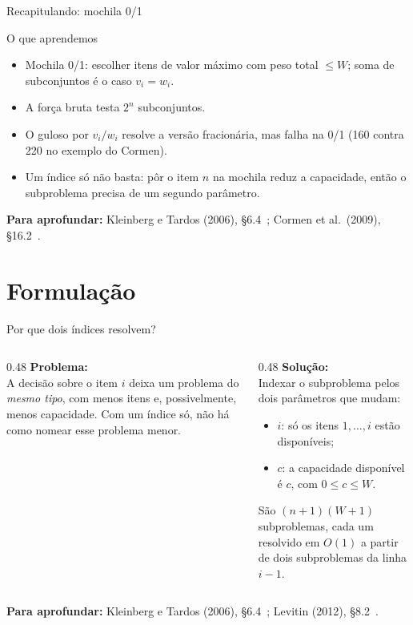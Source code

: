 \documentclass[aspectratio=169,xcolor=table]{beamer}
\newcommand{\fonte}[1]{%
  \vfill
  {\tiny\color{gray!55!black}\textbf{Para aprofundar:} #1\par}%
}
\begin{document}
\begin{frame}{Recapitulando: mochila 0/1}
  \begin{block}{O que aprendemos}
    \begin{itemize}\scriptsize
      \item Mochila 0/1: escolher itens de valor máximo com peso total $\le W$; soma de
            subconjuntos é o caso $v_i = w_i$.
      \item A força bruta testa $2^n$ subconjuntos.
      \item O guloso por $v_i/w_i$ resolve a versão fracionária, mas falha na 0/1
            (160 contra 220 no exemplo do Cormen).
      \item Um índice só não basta: pôr o item $n$ na mochila reduz a capacidade, então o
            subproblema precisa de um segundo parâmetro.
    \end{itemize}
  \end{block}
  \fonte{Kleinberg e Tardos (2006), \S 6.4~\cite{kleinberg2006algorithm};
    Cormen et al.\ (2009), \S 16.2~\cite{cormen2009introduction}.}
\end{frame}

\section{Formulação}

\begin{frame}{Por que dois índices resolvem?}
  \begin{columns}[T]
    \begin{column}{0.48\textwidth}
      \textbf{Problema:}\\[2pt]
      \scriptsize A decisão sobre o item $i$ deixa um problema do \emph{mesmo tipo}, com
      menos itens e, possivelmente, menos capacidade. Com um índice só, não há como
      nomear esse problema menor.
    \end{column}
    \begin{column}{0.48\textwidth}
      \textbf{Solução:}\\[2pt]
      \scriptsize Indexar o subproblema pelos dois parâmetros que mudam:
      \begin{itemize}\scriptsize
        \item $i$: só os itens $1,\dots,i$ estão disponíveis;
        \item $c$: a capacidade disponível é $c$, com $0 \le c \le W$.
      \end{itemize}
      São $(n+1)(W+1)$ subproblemas, cada um resolvido em $O(1)$ a partir de dois
      subproblemas da linha $i-1$.
    \end{column}
  \end{columns}
  \fonte{Kleinberg e Tardos (2006), \S 6.4~\cite{kleinberg2006algorithm};
    Levitin (2012), \S 8.2~\cite{levitin2012introduction}.}
\end{frame}
\end{document}
